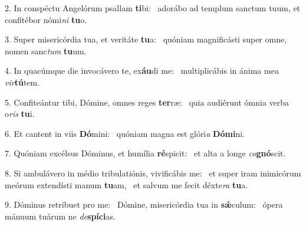 2. In conspéctu Angelórum psallam \textbf{ti}bi: \ast\  adorábo ad templum sanctum tuum, et confitébor nómi\textit{ni} \textbf{tu}o.\

3. Super misericórdia tua, et veritáte \textbf{tu}a: \ast\  quóniam magnificásti super omne, nomen sanc\textit{tum} \textbf{tu}um.\

4. In quacúmque die invocávero te, ex\textbf{áu}di me: \ast\  multiplicábis in ánima mea \textit{vir}\textbf{tú}tem.\

5. Confiteántur tibi, Dómine, omnes reges \textbf{ter}ræ: \ast\  quia audiérunt ómnia verba o\textit{ris} \textbf{tu}i.\

6. Et cantent in viis \textbf{Dó}mini: \ast\  quóniam magna est glóri\textit{a} \textbf{Dó}\textbf{mi}ni.\

7. Quóniam excélsus Dóminus, et humília \textbf{ré}spicit: \ast\  et alta a longe \textit{co}\textbf{gnó}scit.\

8. Si ambulávero in médio tribulatiónis, vivificábis me: \dag\  et super iram inimicórum meórum extendísti manum \textbf{tu}am, \ast\  et salvum me fecit déxte\textit{ra} \textbf{tu}a.\

9. Dóminus retríbuet pro me: \dag\  Dómine, misericórdia tua in \textbf{sǽ}culum: \ast\  ópera mánuum tuárum ne \textit{de}\textbf{spí}\textbf{ci}as.\

